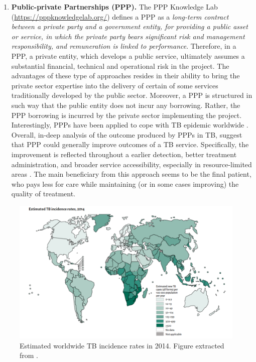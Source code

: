 \documentclass[12pt, a4paper,twoside]{tesi_upf}
\begin{document}
\begin{enumerate}
\item \textbf{Public-private Partnerships (PPP).} The PPP Knowledge Lab (\url{https://pppknowledgelab.org/}) defines a PPP as a \textit{long-term contract between a private party and a government entity, for providing a public asset or service, in which the private party bears significant risk and management responsibility, and remuneration is linked to performance}. Therefore, in a PPP, a private entity, which develops a public service, ultimately assumes a substantial financial, technical and operational risk in the project. The advantages of these type of approaches resides in their ability to bring the private sector expertise into the delivery of certain of some services traditionally developed by the public sector. Moreover, a PPP is structured in such way that the public entity does not incur any borrowing. Rather, the PPP borrowing is incurred by the private sector implementing the project. Interestingly,  PPPs have been applied to cope with TB epidemic worldwide \cite{Karki2007, Murthy2001}. Overall, in-deep analysis of the outcome produced by PPPs in TB, suggest that PPP could generally improve outcomes of a TB service.  Specifically, the improvement is reflected throughout a earlier detection, better treatment administration, and broader service accessibility, especially in resource-limited areas \cite{Lei2015}. The main beneficiary from this approach seems to be the final patient, who pays less for care while maintaining (or in some cases improving) the quality of treatment. 

\end{enumerate}

\begin{figure}[!tbp]
\centering
\includegraphics[width=0.9\linewidth]{../figures/map_incidence_tb.pdf}
	\caption{Estimated worldwide TB incidence rates in 2014. Figure extracted from \cite{Lewandowski2015}.}
\label{fig:map_incidence_tb}
	
	\vspace*{4mm}
\end{figure}
\end{document}
